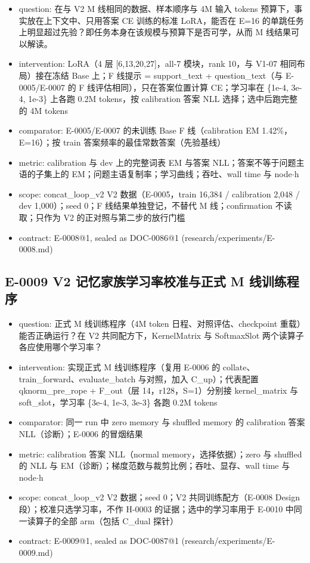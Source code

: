 \documentclass[11pt]{article}
\begin{document}
\begin{itemize}
\item question: 在与 V2 M 线相同的数据、样本顺序与 4M 输入 tokens 预算下，事实放在上下文中、只用答案 CE 训练的标准 LoRA，能否在 E=16 的单跳任务上明显超过先验？即任务本身在该规模与预算下是否可学，从而 M 线结果可以解读。
\item intervention: LoRA（4 层 [6,13,20,27]，all-7 模块，rank 10，与 V1-07 相同布局）接在冻结 Base 上；F 线提示 = support\_text + question\_text（与 E-0005/E-0007 的 F 线评估相同），只在答案位置计算 CE；学习率在 \{1e-4, 3e-4, 1e-3\} 上各跑 0.2M tokens，按 calibration 答案 NLL 选择；选中后跑完整的 4M tokens
\item comparator: E-0005/E-0007 的未训练 Base F 线（calibration EM 1.42\%，E=16）；按 train 答案频率的最佳常数答案（先验基线）
\item metric: calibration 与 dev 上的完整词表 EM 与答案 NLL；答案不等于问题主语的子集上的 EM；问题主语复制率；学习曲线；吞吐、wall time 与 node\ensuremath{\cdot}h
\item scope: concat\_loop\_v2 V2 数据（E-0005，train 16,384 / calibration 2,048 / dev 1,000）；seed 0；F 线结果单独登记，不替代 M 线；confirmation 不读取；只作为 V2 的正对照与第二步的放行门槛
\item contract: E-0008@1, sealed as DOC-0086@1 (research/experiments/E-0008.md)
\end{itemize}

\subsection*{E-0009 V2 记忆家族学习率校准与正式 M 线训练程序}

\begin{itemize}
\item question: 正式 M 线训练程序（4M token 日程、对照评估、checkpoint 重载）能否正确运行？在 V2 共同配方下，KernelMatrix 与 SoftmaxSlot 两个读算子各应使用哪个学习率？
\item intervention: 实现正式 M 线训练程序（复用 E-0006 的 collate、train\_forward、evaluate\_batch 与对照，加入 C\_up）；代表配置 qknorm\_pre\_rope + F\_out（层 14，r128，S=1）分别接 kernel\_matrix 与 soft\_slot，学习率 \{3e-4, 1e-3, 3e-3\} 各跑 0.2M tokens
\item comparator: 同一 run 中 zero memory 与 shuffled memory 的 calibration 答案 NLL（诊断）；E-0006 的冒烟结果
\item metric: calibration 答案 NLL（normal memory，选择依据）；zero 与 shuffled 的 NLL 与 EM（诊断）；梯度范数与裁剪比例；吞吐、显存、wall time 与 node\ensuremath{\cdot}h
\item scope: concat\_loop\_v2 V2 数据；seed 0；V2 共同训练配方（E-0008 Design 段）；校准只选学习率，不作 H-0003 的证据；选中的学习率用于 E-0010 中同一读算子的全部 arm（包括 C\_dual 探针）
\item contract: E-0009@1, sealed as DOC-0087@1 (research/experiments/E-0009.md)
\end{itemize}
\end{document}
